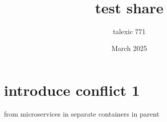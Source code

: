 \documentclass{article}
\title{test share}
\author{talexic 771 }
\date{March 2025}
\begin{document}
\maketitle

\section{introduce conflict 1}
from microservices in separate containers in parent
\end{document}
